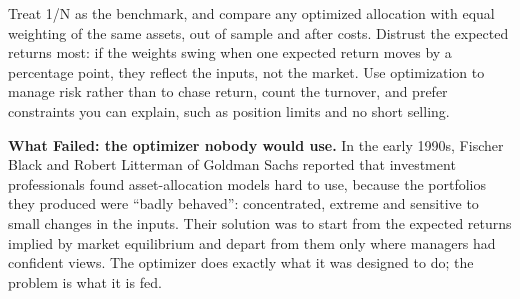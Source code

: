Treat 1/N as the benchmark, and compare any optimized allocation with equal weighting of the same assets, out of sample and after costs. Distrust the expected returns most: if the weights swing when one expected return moves by a percentage point, they reflect the inputs, not the market. Use optimization to manage risk rather than to chase return, count the turnover, and prefer constraints you can explain, such as position limits and no short selling.

\begin{callout}
\textbf{What Failed: the optimizer nobody would use.} In the early 1990s, Fischer Black and Robert Litterman of Goldman Sachs reported that investment professionals found asset-allocation models hard to use, because the portfolios they produced were ``badly behaved'': concentrated, extreme and sensitive to small changes in the inputs. Their solution was to start from the expected returns implied by market equilibrium and depart from them only where managers had confident views. The optimizer does exactly what it was designed to do; the problem is what it is fed.
\end{callout}

\makeatletter
{}
\makeatother

